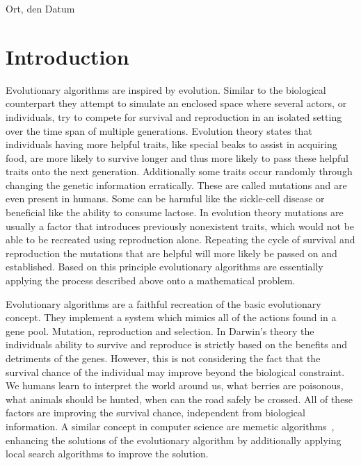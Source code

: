 \documentclass[a4paper,12pt,titlepage, BCOR7mm,headsepline]{scrbook}
\numberwithin{equation}{section}
\begin{document}
\bigskip
\vspace*{1cm}
\noindent
Ort, den Datum

\clearpage

\tableofcontents
\clearpage
\clearpage
\mainmatter
\pagestyle{plain}
\chapter{Introduction}
\pagestyle{headings}
Evolutionary algorithms are inspired by evolution. Similar to the biological counterpart they attempt to simulate 
an enclosed space where several actors, or individuals, try to compete for survival and reproduction in an isolated setting over the time span of multiple generations.
Evolution theory states that individuals having more helpful traits, like special beaks to assist in acquiring food, are more likely to survive longer and 
thus more likely to pass these helpful traits onto the next generation. Additionally some traits occur randomly through changing the genetic information erratically. These are called mutations and are even present in humans. Some can be harmful like the sickle-cell disease or beneficial like the ability to consume lactose. In evolution theory mutations 
are usually a factor that introduces previously nonexistent traits, which would not be able to be recreated using reproduction alone. Repeating the cycle of survival and reproduction the mutations that are helpful will more likely be passed on and established. Based on this principle evolutionary algorithms are essentially applying the process described above onto a mathematical problem. 
%
%
%
%
%
%

Evolutionary algorithms are a faithful recreation of the basic evolutionary concept. They implement a system which mimics all of the actions found in a gene pool. Mutation, reproduction and selection. In Darwin's theory the individuals ability to survive and reproduce is strictly based on the benefits and detriments of the genes. However, this is not considering the fact that the survival chance of the individual may improve beyond the biological constraint. We humans learn to interpret the world around us, what berries are poisonous, what animals should be hunted, when can the road safely be crossed. All of these factors are improving the survival chance, independent from biological information. A similar concept in computer science are memetic algorithms~\cite{moscato1989evolution}, enhancing the solutions of the evolutionary algorithm by additionally applying local search algorithms to improve the solution. 
\end{document}
